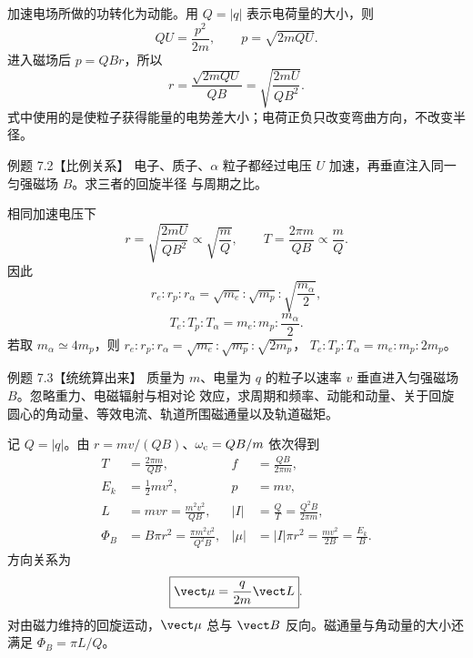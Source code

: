 \begin{xesolution}
加速电场所做的功转化为动能。用 $Q=|q|$ 表示电荷量的大小，则
\[
  QU=\frac{p^2}{2m},
  \qquad p=\sqrt{2mQU}.
\]
进入磁场后 $p=QBr$，所以
\begin{equation}
  \boxed{r=\frac{\sqrt{2mQU}}{QB}
  =\sqrt{\frac{2mU}{QB^2}}}.
\end{equation}
式中使用的是使粒子获得能量的电势差大小；电荷正负只改变弯曲方向，不改变半径。
\end{xesolution}

\Needspace{0.30\textheight}
\begin{origexamplebox}{例题 7.2【比例关系】}
电子、质子、$\alpha$ 粒子都经过电压 $U$ 加速，再垂直注入同一匀强磁场 $B$。求三者的回旋半径
与周期之比。
\end{origexamplebox}

\begin{xesolution}
相同加速电压下
\[
  r=\sqrt{\frac{2mU}{QB^2}}\propto\sqrt{\frac mQ},
  \qquad T=\frac{2\pi m}{QB}\propto\frac mQ.
\]
因此
\begin{equation}
  \boxed{r_e:r_p:r_\alpha
  =\sqrt{m_e}:\sqrt{m_p}:\sqrt{\frac{m_\alpha}{2}}},
\end{equation}
\begin{equation}
  \boxed{T_e:T_p:T_\alpha=m_e:m_p:\frac{m_\alpha}{2}}.
\end{equation}
若取 $m_\alpha\simeq4m_p$，则
$r_e:r_p:r_\alpha=\sqrt{m_e}:\sqrt{m_p}:\sqrt{2m_p}$，
$T_e:T_p:T_\alpha=m_e:m_p:2m_p$。
\end{xesolution}

\Needspace{0.48\textheight}
\begin{origexamplebox}{例题 7.3【统统算出来】}
质量为 $m$、电量为 $q$ 的粒子以速率 $v$ 垂直进入匀强磁场 $B$。忽略重力、电磁辐射与相对论
效应，求周期和频率、动能和动量、关于回旋圆心的角动量、等效电流、轨道所围磁通量以及轨道磁矩。
\end{origexamplebox}

\begin{xesolution}
记 $Q=|q|$。由 $r=mv/(QB)$、$\omega_{\rm c}=QB/m$ 依次得到
\begin{align}
  T&=\frac{2\pi m}{QB},
  & f&=\frac{QB}{2\pi m},\\
  E_k&=\frac12mv^2,
  & p&=mv,\\
  L&=mvr=\frac{m^2v^2}{QB},
  & |I|&=\frac{Q}{T}=\frac{Q^2B}{2\pi m},\\
  \Phi_B&=B\pi r^2=\frac{\pi m^2v^2}{Q^2B},
  & |\mu|&=|I|\pi r^2=\frac{mv^2}{2B}=\frac{E_k}{B}.
\end{align}
方向关系为
\begin{equation}
  \boxed{\vect\mu=\frac{q}{2m}\vect L}.
\end{equation}
对由磁力维持的回旋运动，$\vect\mu$ 总与 $\vect B$ 反向。磁通量与角动量的大小还满足
$\Phi_B=\pi L/Q$。
\end{xesolution}

